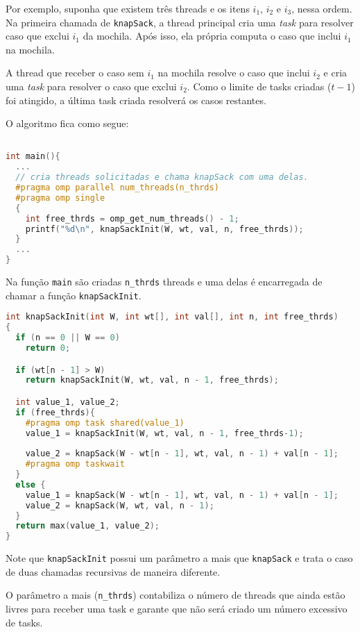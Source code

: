 \documentclass{article}
\begin{document}
Por exemplo, suponha que existem três threads e os itens $i_1$, 
$i_2$ e $i_3$, nessa ordem. Na primeira chamada de 
\texttt{knapSack}, a thread principal cria uma \textit{task} 
para resolver caso que exclui $i_1$ da mochila. Após isso,
ela própria computa o caso que inclui $i_1$ na mochila. 

A thread que receber o caso sem $i_1$ na mochila resolve 
o caso que inclui $i_2$ e cria uma \textit{task} 
para resolver o caso que exclui $i_2$. Como o limite de 
tasks criadas ($t-1$) foi atingido, a última task criada 
resolverá os casos restantes. 

O algoritmo fica como segue:

\begin{lstlisting}[language=c]

int main(){
  ...
  // cria threads solicitadas e chama knapSack com uma delas.
  #pragma omp parallel num_threads(n_thrds)
  #pragma omp single
  {
    int free_thrds = omp_get_num_threads() - 1;
    printf("%d\n", knapSackInit(W, wt, val, n, free_thrds));
  }
  ...
}
\end{lstlisting}

Na função \texttt{main} são criadas \texttt{n\_thrds} threads
e uma delas é encarregada de chamar a função \texttt{knapSackInit}.

\begin{lstlisting}[language=c]
int knapSackInit(int W, int wt[], int val[], int n, int free_thrds)
{
  if (n == 0 || W == 0)
    return 0;

  if (wt[n - 1] > W)
    return knapSackInit(W, wt, val, n - 1, free_thrds);

  int value_1, value_2;
  if (free_thrds){
    #pragma omp task shared(value_1)
    value_1 = knapSackInit(W, wt, val, n - 1, free_thrds-1);
    
    value_2 = knapSack(W - wt[n - 1], wt, val, n - 1) + val[n - 1];
    #pragma omp taskwait
  }
  else {
    value_1 = knapSack(W - wt[n - 1], wt, val, n - 1) + val[n - 1];
    value_2 = knapSack(W, wt, val, n - 1);
  }
  return max(value_1, value_2);
}
\end{lstlisting}

Note que \texttt{knapSackInit} possui um parâmetro a mais 
que \texttt{knapSack} e trata o caso de duas chamadas recursivas
de maneira diferente. 

O parâmetro a mais (\texttt{n\_thrds}) contabiliza o número
de threads que ainda
estão livres para receber uma task e garante que não será
criado um número excessivo de tasks.
\end{document}
